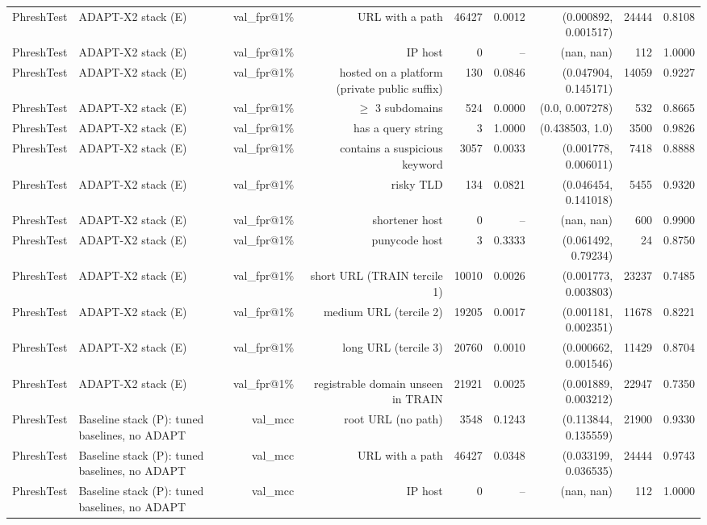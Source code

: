 \begin{table}[t]
\begin{tabular}{llrrrrrrr}
PhreshTest & ADAPT-X2 stack (E) & val\_fpr@1\% & URL with a path & 46427 & 0.0012 & (0.000892, 0.001517) & 24444 & 0.8108 \\
PhreshTest & ADAPT-X2 stack (E) & val\_fpr@1\% & IP host & 0 & -- & (nan, nan) & 112 & 1.0000 \\
PhreshTest & ADAPT-X2 stack (E) & val\_fpr@1\% & hosted on a platform (private public suffix) & 130 & 0.0846 & (0.047904, 0.145171) & 14059 & 0.9227 \\
PhreshTest & ADAPT-X2 stack (E) & val\_fpr@1\% & $\geq$ 3 subdomains & 524 & 0.0000 & (0.0, 0.007278) & 532 & 0.8665 \\
PhreshTest & ADAPT-X2 stack (E) & val\_fpr@1\% & has a query string & 3 & 1.0000 & (0.438503, 1.0) & 3500 & 0.9826 \\
PhreshTest & ADAPT-X2 stack (E) & val\_fpr@1\% & contains a suspicious keyword & 3057 & 0.0033 & (0.001778, 0.006011) & 7418 & 0.8888 \\
PhreshTest & ADAPT-X2 stack (E) & val\_fpr@1\% & risky TLD & 134 & 0.0821 & (0.046454, 0.141018) & 5455 & 0.9320 \\
PhreshTest & ADAPT-X2 stack (E) & val\_fpr@1\% & shortener host & 0 & -- & (nan, nan) & 600 & 0.9900 \\
PhreshTest & ADAPT-X2 stack (E) & val\_fpr@1\% & punycode host & 3 & 0.3333 & (0.061492, 0.79234) & 24 & 0.8750 \\
PhreshTest & ADAPT-X2 stack (E) & val\_fpr@1\% & short URL (TRAIN tercile 1) & 10010 & 0.0026 & (0.001773, 0.003803) & 23237 & 0.7485 \\
PhreshTest & ADAPT-X2 stack (E) & val\_fpr@1\% & medium URL (tercile 2) & 19205 & 0.0017 & (0.001181, 0.002351) & 11678 & 0.8221 \\
PhreshTest & ADAPT-X2 stack (E) & val\_fpr@1\% & long URL (tercile 3) & 20760 & 0.0010 & (0.000662, 0.001546) & 11429 & 0.8704 \\
PhreshTest & ADAPT-X2 stack (E) & val\_fpr@1\% & registrable domain unseen in TRAIN & 21921 & 0.0025 & (0.001889, 0.003212) & 22947 & 0.7350 \\
PhreshTest & Baseline stack (P): tuned baselines, no ADAPT & val\_mcc & root URL (no path) & 3548 & 0.1243 & (0.113844, 0.135559) & 21900 & 0.9330 \\
PhreshTest & Baseline stack (P): tuned baselines, no ADAPT & val\_mcc & URL with a path & 46427 & 0.0348 & (0.033199, 0.036535) & 24444 & 0.9743 \\
PhreshTest & Baseline stack (P): tuned baselines, no ADAPT & val\_mcc & IP host & 0 & -- & (nan, nan) & 112 & 1.0000 \\

\end{tabular}
\end{table}
